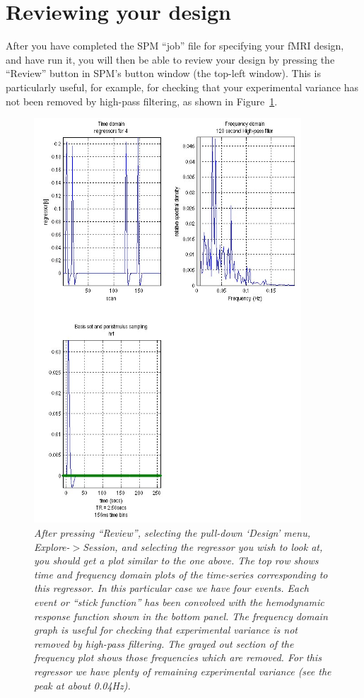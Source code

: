 \section{Reviewing your design \label{explore}}

After you have completed the SPM ``job'' file for specifying your fMRI design, and have run it, you will then be able to review your design by pressing the ``Review'' button in SPM's button window (the top-left window). This is particularly useful, for example, for checking that your experimental variance has not been removed by high-pass filtering, as shown in Figure~\ref{rev4}.

\begin{figure}
\begin{center}
\includegraphics[width=100mm]{fmri_spec/reg4}
\end{center}
\caption{\em After pressing ``Review'', selecting the pull-down `Design' menu, Explore-$>$Session, and selecting the regressor you wish to look at, you should get a plot similar to the one above. The top row shows time and frequency domain plots of the time-series corresponding to this regressor. In this particular case we have four events. Each event or ``stick function'' has been convolved with the hemodynamic response function shown in the bottom panel. The frequency domain graph is useful for checking that experimental variance is not removed by high-pass filtering. The grayed out section of the frequency plot shows those frequencies which are removed. For this regressor we have plenty of remaining experimental variance (see the peak at about 0.04Hz). \label{rev4}}
\end{figure}
